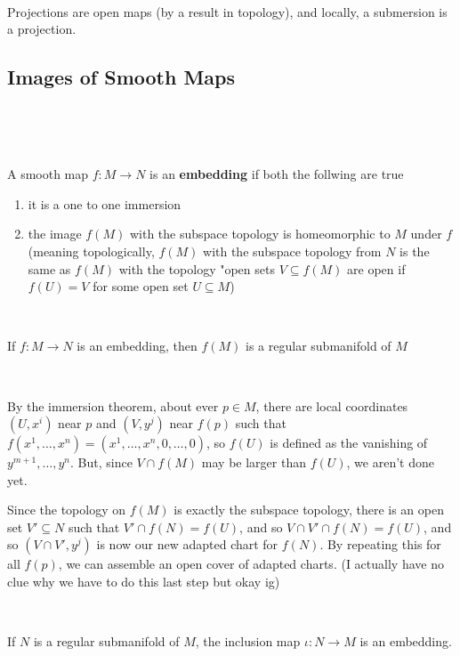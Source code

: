 \documentclass{article}
\begin{document}
\begin{customproof}
  \

  Projections are open maps (by a result in topology), and locally, a submersion is a projection.
\end{customproof}

\subsection{Images of Smooth Maps}
\

\begin{definition}[Embeddings]
  \

  A smooth map $f: M \to N$ is an \textbf{embedding} if both the follwing are true
  \begin{enumerate}
    \item it is a one to one immersion
    \item the image $f(M)$ with the subspace topology is homeomorphic to $M$ under $f$ (meaning topologically, $f(M)$ with the subspace topology from $N$ is the same as $f(M)$ with the topology "open sets $V \subseteq f(M)$ are open if $f(U) = V$ for some open set $U \subseteq M$)
  \end{enumerate}
\end{definition}

\begin{theorem}
  \

  If $f: M \to N$ is an embedding, then $f(M)$ is a regular submanifold of $M$
\end{theorem}

\begin{customproof}
  \

  By the immersion theorem, about ever $p \in M$, there are local coordinates $(U, x^i)$ near $p$ and $(V, y^j)$ near $f(p)$ such that $f(x^1, \dots, x^n) = (x^1, \dots, x^n, 0,\dots, 0)$, so $f(U)$ is defined as the vanishing of $y^{m+1}, \dots, y^n$. But, since $V \cap f(M)$ may be larger than $f(U)$, we aren't done yet.

  Since the topology on $f(M)$ is exactly the subspace topology, there is an open set $V' \subseteq N$ such that $V' \cap f(N) = f(U)$, and so $V \cap V' \cap f(N) = f(U)$, and so $(V \cap V', y^j)$ is now our new adapted chart for $f(N)$. By repeating this for all $f(p)$, we can assemble an open cover of adapted charts. (I actually have no clue why we have to do this last step but okay ig)
\end{customproof}

\begin{theorem}
  \

  If $N$ is a regular submanifold of $M$, the inclusion map $\iota: N \to M$ is an embedding.
\end{theorem}
\end{document}
